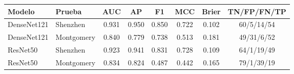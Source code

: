 \begin{tabular}{llcccccc}
\toprule
Modelo & Prueba & AUC & AP & F1 & MCC & Brier & TN/FP/FN/TP\\
\midrule
DenseNet121 & Shenzhen & 0.931 & 0.950 & 0.850 & 0.722 & 0.102 & 60/5/14/54\\
DenseNet121 & Montgomery & 0.840 & 0.779 & 0.738 & 0.513 & 0.181 & 49/31/6/52\\
ResNet50 & Shenzhen & 0.923 & 0.941 & 0.831 & 0.728 & 0.109 & 64/1/19/49\\
ResNet50 & Montgomery & 0.834 & 0.824 & 0.487 & 0.442 & 0.165 & 79/1/39/19\\
\bottomrule
\end{tabular}